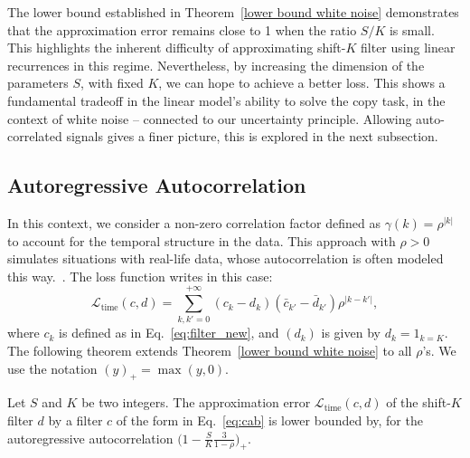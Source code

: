 The lower bound established in Theorem~\ref{lower bound white noise} demonstrates that the approximation error remains close to 1 when the ratio \(S/K\) is small. This highlights the inherent difficulty of approximating shift-$K$ filter using linear recurrences in this regime. Nevertheless, by increasing the dimension of the parameters $S$, with fixed $K$, we can hope to achieve a better loss. This shows a fundamental tradeoff in the linear model's ability to solve the copy task, in the context of white noise -- connected to our uncertainty principle. Allowing auto-correlated signals gives a finer picture, this is explored in the next subsection.

\subsection{Autoregressive Autocorrelation}

In this context, we consider a non-zero correlation factor defined as \(\gamma(k) = \rho^{\vert k\vert}\) to account for the temporal structure in the data. This approach with $\rho>0$ simulates situations with real-life data, whose autocorrelation is often modeled this way.~\citep{brockwell2002introduction}. The loss function writes in this case:
\begin{equation}
    \mathcal{L}_\text{time}(c, d) = \sum_{k,k'=0}^{+\infty}(c_k-d_k)(\bar{c}_{k'}-\bar{d}_{k'})\rho^{\vert k-k'\vert},
    \label{correlated time domain loss}
\end{equation}
where \(c_k\) is defined as in Eq.~\eqref{eq:filter_new}, and \((d_k)\) is given by $d_k = 1_{k=K}$. The following theorem extends Theorem~\ref{lower bound white noise}
to all $\rho$'s. We use the notation $(y)_+=\max(y, 0)$.
  

\begin{theorem}\label{theorem 
autocorrelated lower bound}
Let $S$ and $K$ be two integers. The approximation error $\mathcal{L}_\text{time}(c, d)$ of the shift-$K$ filter $d$ by a filter $c$ of the form in Eq.~\eqref{eq:cab} is lower bounded by, for the autoregressive autocorrelation $\Big(1-\frac{S}{K}\frac{3}{1-\rho}\Big)_+$.
\end{theorem}

